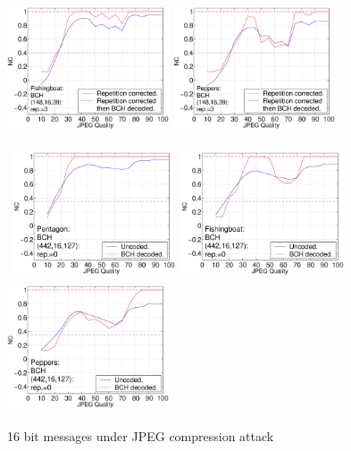 \documentclass[12pt]{report}
\begin{document}
\begin{figure}[p]
{{\includegraphics[height=3.81cm,width=4.8cm]{EPS_BK_formattedBetter/JPGfish148.eps}
\includegraphics[height=3.81cm,width=4.8cm]{EPS_BK_formattedBetter/JPGpep148.eps}\\
}}
\centerline{ \hbox{
\includegraphics[height=3.81cm,width=4.8cm]{EPS_BK_formattedBetter/JPGpent442.eps}
\includegraphics[height=3.81cm,width=4.8cm]{EPS_BK_formattedBetter/JPGfish442.eps}
\includegraphics[height=3.81cm,width=4.8cm]{EPS_BK_formattedBetter/JPGpep442.eps}
}}
\caption{16 bit messages under JPEG compression attack}
\label{figs:JPGpfpBK}
\setlength{\abovecaptionskip}{0cm}
\end{figure}
\end{document}
